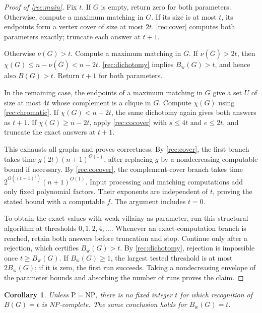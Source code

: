 \documentclass[10pt,a4paper]{amsart}
\numberwithin{equation}{section}
\newtheorem{corollary}[theorem]{Corollary}
\theoremstyle{definition}
\theoremstyle{remark}
\begin{document}
\begin{proof}[Proof of \cref{rec:main}]
Fix $t$. If $G$ is empty, return zero for both parameters.
Otherwise, compute a maximum matching in $G$. If its size is at most
$t$, its endpoints form a vertex cover of size at most $2t$.
\cref{rec:cover} computes both parameters exactly;
truncate each answer at $t+1$.

Otherwise $\nu(G)>t$. Compute a maximum matching in $\overline G$.
If $\nu(\overline G)>2t$, then
$\chi(G)\leq n-\nu(\overline G)<n-2t$.
\cref{rec:dichotomy} implies $B_{\mathrm w}(G)>t$, and hence also
$B(G)>t$. Return $t+1$ for both parameters.

In the remaining case, the endpoints of a maximum matching in
$\overline G$ give a set $U$ of size at most $4t$ whose complement
is a clique in $G$. Compute $\chi(G)$ using
\cref{rec:chromatic}. If $\chi(G)<n-2t$, the same dichotomy
again gives both answers as $t+1$. If $\chi(G)\geq n-2t$, apply
\cref{rec:cocover} with $s\leq4t$ and $e\leq2t$, and
truncate the exact answers at $t+1$.

This exhausts all graphs and proves correctness. By \cref{rec:cover},
the first branch takes time $g(2t)(n+1)^{O(1)}$, after replacing
$g$ by a nondecreasing computable bound if necessary.
By \cref{rec:cocover}, the complement-cover branch takes time
$2^{O((t+1)^2)}(n+1)^{O(1)}$. Input processing and matching
computations add only fixed polynomial factors. Their exponents
are independent of $t$, proving the stated bound with a computable
$f$. The argument includes $t=0$.

To obtain the exact values with weak villainy as parameter, run this
structural algorithm at
thresholds $0,1,2,4,\ldots$. Whenever an exact-computation branch
is reached, retain both answers before truncation and stop.
Continue only after a rejection, which certifies
$B_{\mathrm w}(G)>t$. By \cref{rec:dichotomy}, rejection is
impossible once $t\ge B_{\mathrm w}(G)$.
If $B_{\mathrm w}(G)\ge1$, the largest tested threshold is at most
$2B_{\mathrm w}(G)$; if it is zero, the first run succeeds.
Taking a nondecreasing envelope of the parameter bounds and
absorbing the number of runs proves the claim.
\end{proof}

\begin{corollary}\label{rec:fixed-complexity}
Unless $\mathrm P=\mathrm{NP}$, there is no fixed integer $t$ for
which recognition of $B(G)=t$ is NP-complete. The same conclusion
holds for $B_{\mathrm w}(G)=t$.
\end{corollary}
\end{document}
